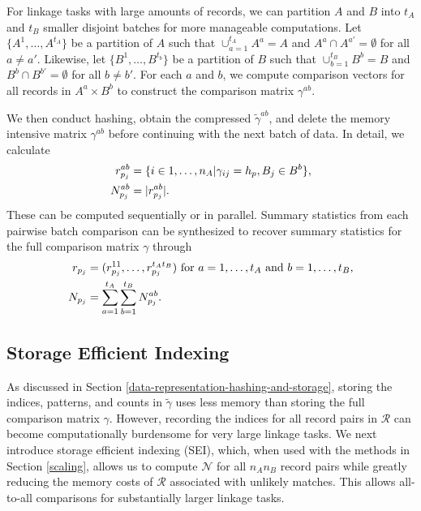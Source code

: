 \documentclass[ba]{imsart}
\begin{document}
		For linkage tasks with large amounts of records, we can partition $A$ and $B$ into $t_A$ and $t_B$ smaller disjoint batches for more manageable computations. Let $\{A^1, \dots, A^{t_A}\}$ be a partition of $A$ such that $\cup_{a=1}^{t_A} A^a = A$ and $A^a \cap A^{a'}=\emptyset$ for all $a \neq a'$.  Likewise, let $\{B^1, \dots, B^{t_b}\}$ be a partition of $B$ such that $\cup_{b=1}^{t_B} B^b = B$ and $B^b \cap B^{b'}=\emptyset$ for all $b \neq b'$. For each $a$ and $b$, we compute comparison vectors for all records in $A^a \times B^b$ to construct the comparison matrix $\gamma^{ab}$. 
		
		We then conduct hashing, obtain the compressed $\tilde{\gamma}^{ab}$, and delete the memory intensive matrix $\gamma^{ab}$ before continuing with the next batch of data. In detail, we calculate
\begin{subequations}
	\begin{align}
		r_{p_j}^{ab} &= \{i \in 1, \dots, n_A| \gamma_{ij} = h_p, B_j \in B^b\}, \label{r_{p_j}^{ab}} \\
		N_{p_j}^{ab} &= |r_{p_j}^{ab}|. \label{N_{p_j}^{ab}}
	\end{align}
\end{subequations}
These can be computed sequentially or in parallel. Summary statistics from each pairwise batch comparison can be synthesized to recover summary statistics for the full comparison matrix $\gamma$ through
\begin{subequations}
	\begin{align}
		r_{p_j} &= (r_{p_j}^{11}, \ldots, r_{p_j}^{ t_A t_B}) \text{ for } a = 1, \ldots, t_A \text{ and } b = 1, \ldots, t_B, \label{r_{p_j}} \\
		N_{p_j} &= \sum_{a = 1}^{t_A} \sum_{b = 1}^{t_B} N_{p_j}^{ab}.\label{N_{p_j}}	\end{align}
\end{subequations} 

\hypertarget{SEI}{%
	\subsection{Storage Efficient Indexing}\label{SEI}}

As discussed in Section \ref{data-representation-hashing-and-storage}, storing the indices, patterns, and counts in $\tilde{\gamma}$ uses less memory than storing the full comparison matrix $\gamma$. However, recording the indices for all record pairs in $\mathcal{R}$ can become computationally burdensome for very large linkage tasks. We next introduce storage efficient indexing (SEI), which, when used with the methods in Section \ref{scaling}, allows us to compute $\mathcal{N}$ for all $n_A n_B$ record pairs while greatly reducing the memory costs of $\mathcal{R}$ associated with unlikely matches. This allows all-to-all comparisons for substantially larger linkage tasks.
\end{document}
